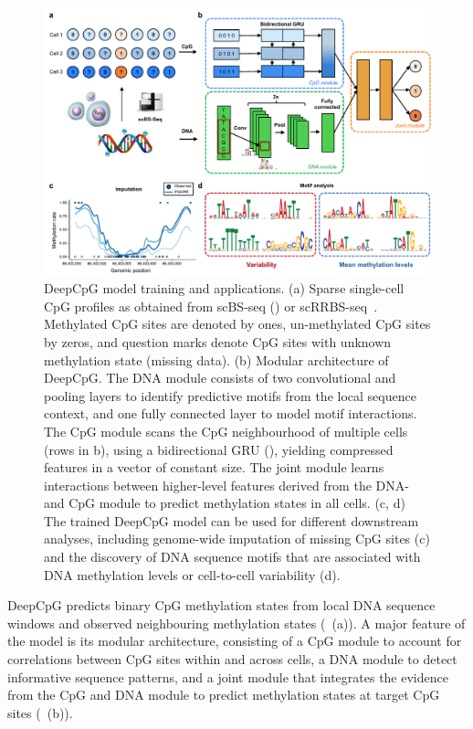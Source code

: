 \begin{figure}[htbp!]
\centering
\includegraphics[width=1.0\textwidth]{method}
\caption[DeepCpG model training and applications.]{DeepCpG model training and applications. (a) Sparse single-cell CpG profiles as obtained from scBS-seq () or scRRBS-seq~\citep{farlik_single-cell_2015,guo_profiling_2015,hou_single-cell_2016}. Methylated CpG sites are denoted by ones, un-methylated CpG sites by zeros, and question marks denote CpG sites with unknown methylation state (missing data). (b) Modular architecture of DeepCpG. The DNA module consists of two convolutional and pooling layers to identify predictive motifs from the local sequence context, and one fully connected layer to model motif interactions. The CpG module scans the CpG neighbourhood of multiple cells (rows in b), using a bidirectional GRU (), yielding compressed features in a vector of constant size. The joint module learns interactions between higher-level features derived from the DNA- and CpG module to predict methylation states in all cells. (c, d) The trained DeepCpG model can be used for different downstream analyses, including genome-wide imputation of missing CpG sites (c) and the discovery of DNA sequence motifs that are associated with DNA methylation levels or cell-to-cell variability (d).}
\label{fig:dcpg_method}
\end{figure}

DeepCpG predicts binary CpG methylation states from local DNA sequence windows and observed neighbouring methylation states (~(a)). A major feature of the model is its modular architecture, consisting of a CpG module to account for correlations between CpG sites within and across cells, a DNA module to detect informative sequence patterns, and a joint module that integrates the evidence from the CpG and DNA module to predict methylation states at target CpG sites (~(b)).


